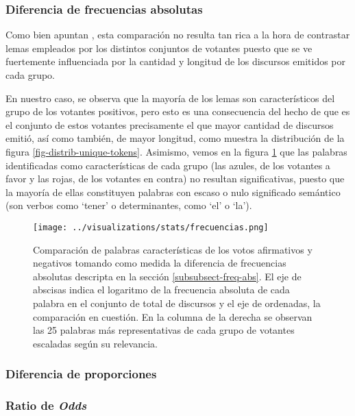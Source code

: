 \subsubsection{Diferencia de frecuencias absolutas}
Como bien apuntan \cite{monroe2008fightin}, esta comparación no resulta tan rica
a la hora de contrastar lemas empleados por los distintos conjuntos de
votantes puesto que se ve fuertemente influenciada por la cantidad y longitud
de los discursos emitidos por cada grupo.
\par
En nuestro caso, se observa que la mayor\'ia de los lemas son característicos
del grupo de los votantes positivos, pero esto es una consecuencia del hecho
de que es el conjunto de estos votantes precisamente el que mayor cantidad de
discursos emitió, así como también, de mayor longitud, como muestra la distribución
de la figura \ref{fig-distrib-unique-tokens}. Asimismo, vemos en la figura
\ref{fig-statistics-freq-abs} que las palabras identificadas como características
de cada grupo (las azules, de los votantes a favor y las rojas, de los votantes
en contra) no resultan significativas, puesto que la mayoría de ellas constituyen
palabras con escaso o nulo significado semántico (son verbos como `tener' o
determinantes, como `el' o `la').

\begin{figure}[h!]
    \centering
    \texttt{[image: ../visualizations/stats/frecuencias.png]}
    \caption{Comparación de palabras características de los votos afirmativos y
    negativos tomando como medida la diferencia de frecuencias absolutas descripta
    en la sección \ref{subsubsect-freq-abs}. El eje de abscisas indica el logaritmo
    de la frecuencia absoluta de cada palabra en el conjunto de total de discursos
    y el eje de ordenadas, la comparación en cuestión. En la columna de la
    derecha se observan las 25 palabras más representativas de cada grupo de
    votantes escaladas según su relevancia.}
    \label{fig-statistics-freq-abs}
\end{figure}

\subsubsection{Diferencia de proporciones}

\subsubsection{Ratio de \textit{Odds}}

